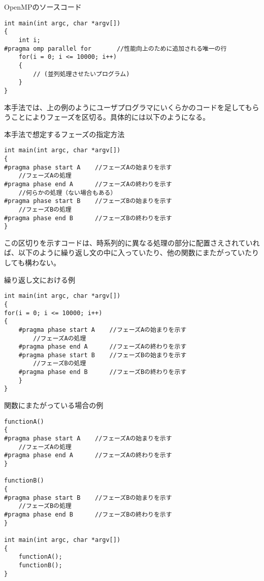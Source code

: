 {\small
\begin{itembox}[c]{OpenMPのソースコード}
\begin{verbatim}
int main(int argc, char *argv[])
{
    int i;
#pragma omp parallel for       //性能向上のために追加される唯一の行
    for(i = 0; i <= 10000; i++)
    {
        // (並列処理させたいプログラム)
    }
}
\end{verbatim}
\end{itembox}}

本手法では、上の例のようにユーザプログラマにいくらかのコードを足してもらうことによりフェーズを区切る。具体的には以下のようになる。

{\small
\begin{itembox}[c]{本手法で想定するフェーズの指定方法}
\begin{verbatim}
int main(int argc, char *argv[])
{
#pragma phase start A    //フェーズAの始まりを示す
    //フェーズAの処理
#pragma phase end A      //フェーズAの終わりを示す
    //何らかの処理（ない場合もある）
#pragma phase start B    //フェーズBの始まりを示す
    //フェーズBの処理
#pragma phase end B      //フェーズBの終わりを示す
}
\end{verbatim}
\end{itembox}}

この区切りを示すコードは、時系列的に異なる処理の部分に配置さえされていれば、以下のように繰り返し文の中に入っていたり、他の関数にまたがっていたりしても構わない。

{\small
\begin{itembox}[c]{繰り返し文における例}
\begin{verbatim}
int main(int argc, char *argv[])
{
for(i = 0; i <= 10000; i++)
{
    #pragma phase start A    //フェーズAの始まりを示す
        //フェーズAの処理
    #pragma phase end A      //フェーズAの終わりを示す
    #pragma phase start B    //フェーズBの始まりを示す
        //フェーズBの処理
    #pragma phase end B      //フェーズBの終わりを示す
    }
}
\end{verbatim}
\end{itembox}}

{\small
\begin{itembox}[c]{関数にまたがっている場合の例}
\begin{verbatim}
functionA()
{
#pragma phase start A    //フェーズAの始まりを示す
    //フェーズAの処理
#pragma phase end A      //フェーズAの終わりを示す
}

functionB()
{
#pragma phase start B    //フェーズBの始まりを示す
    //フェーズBの処理
#pragma phase end B      //フェーズBの終わりを示す
}

int main(int argc, char *argv[])
{
    functionA();
    functionB();
}
\end{verbatim}
\end{itembox}}


